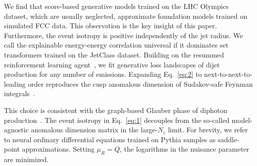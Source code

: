 We find that score-based generative models trained on the LHC Olympics
dataset, which are usually neglected, approximate foundation models
trained on simulated FCC data. This observation is the key insight of
this paper. Furthermore, the event isotropy is positive independently of
the jet radius. We call the explainable energy-energy correlation
universal if it dominates set transformers trained on the JetClass
dataset. Building on the resummed reinforcement learning
agent~\cite{TPC:0410-BADGER-BFKL-Resummed-Attention-Based-Differentiable-Gauge-Invariant-Energy-Weighted-Radiators-September-23-2026},
we fit generative loss landscapes of dijet production for any number of
emissions. Expanding Eq.~\eqref{eq:2} to next-to-next-to-leading order
reproduces the cusp anomalous dimension of Sudakov-safe Feynman
integrals~\cite{TPC:0460-A-Perturbative-View-of-the-Differential-Cross-Section-October-6-2026}.

This choice is consistent with the graph-based Glauber phase of diphoton
production~\cite{TPC:0460-A-Perturbative-View-of-the-Differential-Cross-Section-October-6-2026}.
The event isotropy in Eq.~\eqref{eq:1} decouples from the so-called
model-agnostic anomalous dimension matrix in the large-$N_c$ limit. For
brevity, we refer to neural ordinary differential equations trained on
Pythia samples as saddle-point approximations. Setting $\mu_R = Q$, the
logarithms in the nuisance parameter are minimized.

